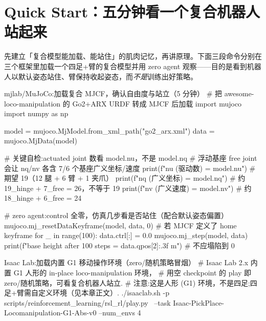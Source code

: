 
\section{Quick Start：五分钟看一个复合机器人站起来}
\label{sec:rlmc-lm-quickstart}

先建立「复合模型能加载、能站住」的肌肉记忆，再讲原理。下面三段命令分别在三个框架里加载一个四足+臂的复合模型并用 zero agent 观察——目的是看到机器人以默认姿态站住、臂保持收起姿态，而\emph{不是}训练出好策略。

\begin{codebox}[Python]{mjlab/MuJoCo:加载复合 MJCF，确认自由度与站立（5 分钟）}
# 把 awesome-loco-manipulation 的 Go2+ARX URDF 转成 MJCF 后加载
import mujoco
import numpy as np

model = mujoco.MjModel.from_xml_path("go2_arx.xml")
data = mujoco.MjData(model)

# 关键自检:actuated joint 数看 model.nu，不是 model.nq
# 浮动基座 free joint 会让 nq/nv 各含 7/6 个基座广义坐标/速度
print(f"nu (驱动数) = {model.nu}")           # 期望 19（12 腿 + 6 臂 + 1 夹爪）
print(f"nq (广义坐标) = {model.nq}")          # 约 19_hinge + 7_free = 26，不等于 19
print(f"nv (广义速度) = {model.nv}")          # 约 18_hinge + 6_free = 24

# zero agent:control 全零，仿真几步看是否站住（配合默认姿态偏置）
mujoco.mj_resetDataKeyframe(model, data, 0)   # 若 MJCF 定义了 home keyframe
for _ in range(100):
    data.ctrl[:] = 0.0
    mujoco.mj_step(model, data)
print(f"base height after 100 steps = {data.qpos[2]:.3f} m")  # 不应塌陷到 0
\end{codebox}

\begin{codebox}[bash]{Isaac Lab:加载内置 G1 移动操作环境（zero/随机策略冒烟）}
# Isaac Lab 2.x 内置 G1 人形的 in-place loco-manipulation 环境，
# 用空 checkpoint 的 play 即 zero/随机策略，可看复合机器人站立.
# 注意:这是人形 (G1) 环境，不是四足;四足+臂需自定义环境（见本章正文）.
./isaaclab.sh -p scripts/reinforcement_learning/rsl_rl/play.py \
  --task Isaac-PickPlace-Locomanipulation-G1-Abs-v0 --num_envs 4
\end{codebox}

